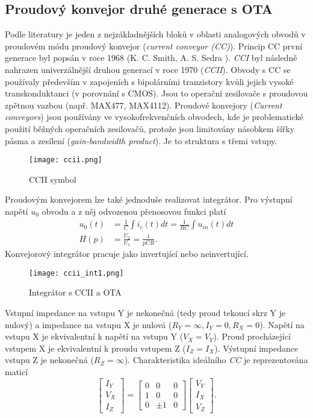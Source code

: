 \subsection{Proudový konvejor druhé generace s OTA}
Podle literatury \cite{12} je jeden z nejzákladnějších bloků v oblasti analogových obvodů v proudovém módu proudový konvejor (\textit{current conveyor (CC)}). Princip CC první generace byl popsán v roce 1968 (K. C. Smith, A. S. Sedra \cite{10}). \textit{CCI} byl následně nahrazen univerzálnější druhou generací v roce 1970 (\textit{CCII})\cite{11}. Obvody s CC se používaly především v zapojeních s bipolárními tranzistory kvůli jejich vysoké transkonduktanci (v porovnání s CMOS). Jsou to operační zesilovače s proudovou zpětnou vazbou (např. MAX477, MAX4112). Proudové konvejory (\textit{Current conveyors}) jsou používány ve vysokofrekvenčních obvodech, kde je problematické použití běžných operačních zesilovačů, protože jsou limitovány násobkem šířky pásma a zesílení (\textit{gain-bandwidth product}). Je to struktura s třemi vstupy.
\begin{figure}[h]
\centering
\texttt{[image: ccii.png]}
\caption[CCII symbol]{CCII symbol \cite{12}}
\end{figure}
\noindent Proudovým konvejorem lze také jednoduše realizovat integrátor. Pro výstupní napětí $u_0$ obvodu a z něj odvozenou přenosovou funkci platí
\begin{align}
u_0(t) &= \frac{1}{C}\int i_c(t)dt = \frac{1}{RC}\int u_{in}(t)dt \\
H(p) &= \frac{U_2}{U_1} = \frac{1}{pCR}.
\end{align}
\noindent Konvejorový integrátor pracuje jako invertující nebo neinvertující.
\begin{figure}[h]
\centering
\texttt{[image: ccii\_int1.png]}
\caption[Integrátor s CCII a OTA]{Integrátor s CCII a OTA \cite{7}}
\end{figure}
\noindent Vstupní impedance na vstupu Y je nekonečná (tedy proud tekoucí skrz Y je nulový) a impedance na vstupu X je nulová ($R_Y = \infty, I_Y = 0, R_X = 0$). Napětí na vstupu X je ekvivalentní k napětí na vstupu Y ($V_X = V_Y$). Proud procházející vstupem X je ekvivalentní k proudu vstupem Z ($I_Z = I_X$). Výstupní impedance vstupu Z je nekonečná ($R_Z = \infty$).
Charakteristika ideálního \textit{CC} je reprezentována maticí
\begin{equation}
\begin{bmatrix}
I_Y \\ V_X \\ I_Z
\end{bmatrix}
=
\begin{bmatrix}
0 & 0 & 0 \\
1 & 0 & 0 \\
0 & \pm 1 & 0 
\end{bmatrix}
\begin{bmatrix}
V_Y \\
I_X \\
V_Z
\end{bmatrix}.
\end{equation}
